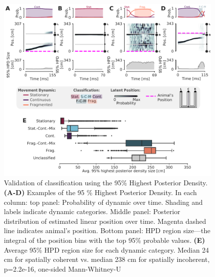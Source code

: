 \documentclass[9pt,lineno]{elife}
\providecommand{\DIFaddbeginFL}{} %
\providecommand{\DIFaddendFL}{} %
\providecommand{\DIFdelbeginFL}{} %
\providecommand{\DIFdelendFL}{} %
\newcommand{\DIFscaledelfig}{0.5}
\newlength{\DIFdelgraphicswidth} %
\newlength{\DIFdelgraphicsheight} %
\newcommand{\DIFaddincludegraphics}[2][]{{\color{blue}\fbox{\DIFOincludegraphics[#1]{#2}}}} %
\newcommand{\DIFdelincludegraphics}[2][]{%
\sbox{\DIFdelgraphicsbox}{\DIFOincludegraphics[#1]{#2}}%
\settoboxwidth{\DIFdelgraphicswidth}{\DIFdelgraphicsbox} %
\settoboxtotalheight{\DIFdelgraphicsheight}{\DIFdelgraphicsbox} %
\scalebox{\DIFscaledelfig}{%
\parbox[b]{\DIFdelgraphicswidth}{\usebox{\DIFdelgraphicsbox}\\[-\baselineskip] \rule{\DIFdelgraphicswidth}{0em}}\llap{\resizebox{\DIFdelgraphicswidth}{\DIFdelgraphicsheight}{%
\setlength{\unitlength}{\DIFdelgraphicswidth}%
\begin{picture}(1,1)%
\thicklines\linethickness{2pt} %
{\color[rgb]{1,0,0}\put(0,0){\framebox(1,1){}}}%
{\color[rgb]{1,0,0}\put(0,0){\line( 1,1){1}}}%
{\color[rgb]{1,0,0}\put(0,1){\line(1,-1){1}}}%
\end{picture}%
}\hspace*{3pt}}} %
} %
\DeclareRobustCommand{\DIFaddbeginFL}{\DIFOaddbeginFL \let\includegraphics\DIFaddincludegraphics} %
\DeclareRobustCommand{\DIFaddendFL}{\DIFOaddendFL \let\includegraphics\DIFOincludegraphics} %
\DeclareRobustCommand{\DIFdelbeginFL}{\DIFOdelbeginFL \let\includegraphics\DIFdelincludegraphics} %
\DeclareRobustCommand{\DIFdelendFL}{\DIFOaddendFL \let\includegraphics\DIFOincludegraphics} %
\begin{document}
\begin{figure}
\DIFdelbeginFL %
\DIFdelendFL \DIFaddbeginFL \includegraphics[width=0.80\linewidth]{figures/Figure4/Figure4_final}
\DIFaddendFL \caption{Validation of classification using the 95\% Highest Posterior Density. \textbf{(A-D)}  Examples of the 95 \% Highest Posterior Density. In each column: top panel: Probability of dynamic over time. Shading and labels indicate dynamic categories. Middle panel: Posterior distribution of estimated linear position over time. Magenta dashed line indicates animal's position. Bottom panel: HPD region size---the integral of the position bins with the top 95\% probable values. \textbf{(E)} Average 95\% HPD region size for each dynamic category. Median 24 cm for spatially coherent vs. median 238 cm for spatially incoherent, p=2.2e-16, one-sided Mann-Whitney-U}
\label{fig:4}


\end{figure}
\end{document}
